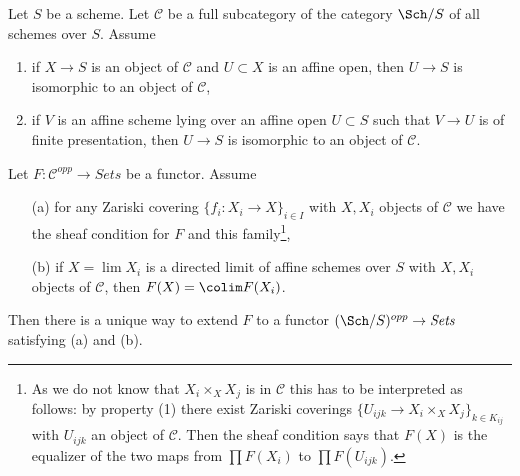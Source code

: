 \begin{lemma}
\label{lemma-extend}
Let $S$ be a scheme. Let $\mathcal{C}$ be a full subcategory
of the category $\Sch/S$ of all schemes over $S$. Assume
\begin{enumerate}
\item if $X \to S$ is an object of $\mathcal{C}$ and
$U \subset X$ is an affine open, then $U \to S$ is isomorphic
to an object of $\mathcal{C}$,
\item if $V$ is an affine scheme lying over an affine open $U \subset S$
such that $V \to U$ is of finite presentation, then $U \to S$ is isomorphic
to an object of $\mathcal{C}$.
\end{enumerate}
Let $F : \mathcal{C}^{opp} \to \textit{Sets}$ be a functor.
Assume
\begin{enumerate}
\item[(a)] for any Zariski covering $\{f_i : X_i \to X\}_{i \in I}$
with $X, X_i$ objects of $\mathcal{C}$ we have
the sheaf condition for $F$ and this family\footnote{As we
do not know that $X_i \times_X X_j$ is in $\mathcal{C}$
this has to be interpreted as follows: by property (1)
there exist Zariski coverings $\{U_{ijk} \to X_i \times_X X_j\}_{k \in K_{ij}}$
with $U_{ijk}$ an object of $\mathcal{C}$. Then the sheaf condition
says that $F(X)$ is the equalizer of the two maps
from $\prod F(X_i)$ to $\prod F(U_{ijk})$.},
\item[(b)] if $X = \lim X_i$ is a directed limit of affine schemes
over $S$ with $X, X_i$ objects of $\mathcal{C}$, then
$F(X) = \colim F(X_i)$.
\end{enumerate}
Then there is a unique way to extend $F$ to a functor
$(\Sch/S)^{opp} \to \textit{Sets}$ satisfying
(a) and (b).
\end{lemma}

